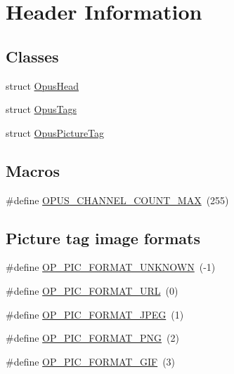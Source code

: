 \hypertarget{group__header__info}{}\section{Header Information}
\label{group__header__info}
\subsection*{Classes}
\begin{DoxyCompactItemize}
\item 
struct \mbox{\hyperlink{struct_opus_head}{Opus\+Head}}
\item 
struct \mbox{\hyperlink{struct_opus_tags}{Opus\+Tags}}
\item 
struct \mbox{\hyperlink{struct_opus_picture_tag}{Opus\+Picture\+Tag}}
\end{DoxyCompactItemize}
\subsection*{Macros}
\begin{DoxyCompactItemize}
\item 
\#define \mbox{\hyperlink{group__header__info_gad6f0329582430a828244045ac85a5417}{O\+P\+U\+S\+\_\+\+C\+H\+A\+N\+N\+E\+L\+\_\+\+C\+O\+U\+N\+T\+\_\+\+M\+AX}}~(255)
\end{DoxyCompactItemize}
\subsection*{Picture tag image formats}
\begin{DoxyCompactItemize}
\item 
\#define \mbox{\hyperlink{group__header__info_gade2f09dce6330529fc3c96d1740df653}{O\+P\+\_\+\+P\+I\+C\+\_\+\+F\+O\+R\+M\+A\+T\+\_\+\+U\+N\+K\+N\+O\+WN}}~(-\/1)
\item 
\#define \mbox{\hyperlink{group__header__info_gaac4ef30a33caf090b9b1a5ada8f48204}{O\+P\+\_\+\+P\+I\+C\+\_\+\+F\+O\+R\+M\+A\+T\+\_\+\+U\+RL}}~(0)
\item 
\#define \mbox{\hyperlink{group__header__info_gaf75ae037b78a4a048359261439395450}{O\+P\+\_\+\+P\+I\+C\+\_\+\+F\+O\+R\+M\+A\+T\+\_\+\+J\+P\+EG}}~(1)
\item 
\#define \mbox{\hyperlink{group__header__info_ga703554b177ae75bd6999bbd30d485d3f}{O\+P\+\_\+\+P\+I\+C\+\_\+\+F\+O\+R\+M\+A\+T\+\_\+\+P\+NG}}~(2)
\item 
\#define \mbox{\hyperlink{group__header__info_gaa7d5e8cb675cb2da840f258b761e7781}{O\+P\+\_\+\+P\+I\+C\+\_\+\+F\+O\+R\+M\+A\+T\+\_\+\+G\+IF}}~(3)
\end{DoxyCompactItemize}
